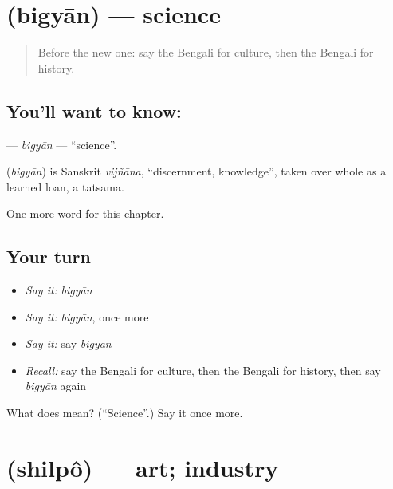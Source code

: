 \section[\texorpdfstring{\bn{বিজ্ঞান} (bigyān)}{বিজ্ঞান (bigyān)}]{ (bigyān) — science}

\label{lesson:BN-C256-bigyan}



\begin{quote}
Before the new one: say the Bengali for culture, then the Bengali for history.
\end{quote}

\subsection*{You'll want to know: }
\textbf{} — \emph{bigyān} — \textquotedblleft{}science\textquotedblright{}.

\begin{cousinweb}
\textbf{} (\emph{bigyān}) is Sanskrit \emph{vijñāna}, \textquotedblleft{}discernment, knowledge\textquotedblright{}, taken over whole as a learned loan, a tatsama.
\end{cousinweb}

\begin{grammarlens}[title={What you've built}]
One more word for this chapter.
\end{grammarlens}

\subsection*{Your turn}
\begin{itemize}
\raggedright
  \item \emph{Say it:} \emph{bigyān}
  \item \emph{Say it:} \emph{bigyān}, once more
  \item \emph{Say it:} say \emph{bigyān}
  \item \emph{Recall:} say the Bengali for culture, then the Bengali for history, then say \emph{bigyān} again
\end{itemize}

\begin{tcolorbox}[breakable,colback=teal!4,colframe=teal!35!black,title={Before you move on}]
What does  mean? (\textquotedblleft{}Science\textquotedblright{}.) Say it once more.
\end{tcolorbox}
\section[\texorpdfstring{\bn{শিল্প} (shilpô)}{শিল্প (shilpô)}]{ (shilpô) — art; industry}


